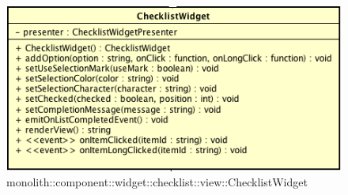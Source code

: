 \label{monolith::component::widget::checklist::view::ChecklistWidget}
\begin{figure}[ht]
	\centering
	\includegraphics[scale=0.5]{Sezioni/SottosezioniST/img/ChecklistWidget.png}
	\caption{monolith::component::widget::checklist::view::ChecklistWidget}
\end{figure}

